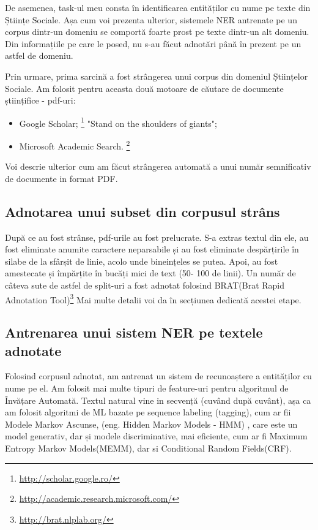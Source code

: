 De asemenea, task-ul meu consta în identificarea entităților cu nume pe texte din Științe Sociale. Așa cum voi prezenta ulterior, sistemele NER antrenate pe un corpus dintr-un domeniu se comportă foarte prost pe texte dintr-un alt domeniu. Din informațiile pe care le posed, nu s-au făcut adnotări până în prezent pe un astfel de domeniu.

Prin urmare, prima sarcină a fost strângerea unui corpus din domeniul Științelor Sociale. Am folosit pentru aceasta două motoare de căutare de documente științifice - pdf-uri:

\begin{itemize}
\item Google Scholar; \footnote{\url{http://scholar.google.ro/}} "Stand on the shoulders of giants";
\item Microsoft Academic Search. \footnote{\url{http://academic.research.microsoft.com/}}
\end{itemize}

Voi descrie ulterior cum am făcut strângerea automată a unui număr semnificativ de documente in format PDF.

\subsection{Adnotarea unui subset din corpusul strâns}

După ce au fost strânse, pdf-urile au fost prelucrate. S-a extras textul din ele, au fost eliminate anumite caractere neparsabile și au fost eliminate despărțirile în silabe de la sfârșit de linie, acolo unde bineințeles se putea. Apoi, au fost amestecate și împărțite în bucăți mici de text (50- 100 de linii). Un număr de câteva sute de astfel de split-uri a fost adnotat folosind BRAT(Brat Rapid Adnotation Tool)\footnote{\url{http://brat.nlplab.org/}} Mai multe detalii voi da în secțiunea dedicată acestei etape.

\subsection{Antrenarea unui sistem NER pe textele adnotate}

Folosind corpusul adnotat, am antrenat un sistem de recunoaștere a entităților cu nume pe el. Am folosit mai multe tipuri de feature-uri pentru algoritmul de Învățare Automată. Textul natural vine in secvență (cuvând după cuvânt), așa ca am folosit algoritmi de ML bazate pe sequence labeling (tagging), cum ar fii Modele Markov Ascunse, (eng. Hidden Markov Models - HMM) , care este un model generativ, dar și modele discriminative, mai eficiente, cum ar fi Maximum Entropy Markov Models(MEMM), dar si Conditional Random Fields(CRF).


